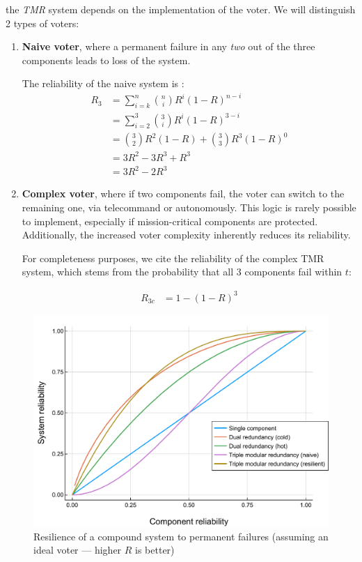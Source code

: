 \documentclass[a4paper,nobib]{tufte-book}
\begin{document}
 
 the \emph{\ac{TMR}} system depends on the implementation of the voter. We will distinguish 2 types of voters:
\begin{enumerate}
	\item \textbf{Naive voter}, where a permanent failure in any \emph{two} out of the three components leads to loss of the system.
	
	The reliability of the naive system is \autocite[31]{birolini_reliability_engineering_2004}:
	\begin{align}
	R_3 &= \sum_{i=k}^{n} \binom{n}{i} R^i (1-R)^{n-i}\nonumber\\
	&= \sum_{i=2}^{3} \binom{3}{i} R^i (1-R)^{3-i} \nonumber\\
	&= \binom{3}{2} R^2 (1-R) + \binom{3}{3} R^3 (1-R)^0 \nonumber\\
	&= 3R^2 - 3R^3 + R^3 \nonumber\\
	&= 3R^2 - 2R^3
	\label{eq:tmr}
	\end{align}
	
	\item \textbf{Complex voter}, where if two components fail, the voter can switch to the remaining one, via telecommand or autonomously. This logic is rarely possible to implement, especially if mission-critical components are protected. Additionally, the increased voter complexity inherently reduces its reliability.
	
	For completeness purposes, we cite the reliability of the complex \acs{TMR} system, which stems from the probability that all 3 components fail within \( t \):

	\begin{align}
	R_{3c} &= 1 - (1 - R)^3
	\label{eq:tmr_complex}
	\end{align}
\end{enumerate}


\begin{figure}
	\centering
	\includegraphics{analysis/reliability_norepair_en}
	\caption[Resilience of a compound system to permanent failures (assuming an ideal voter)]{Resilience of a compound system to permanent failures (assuming an ideal voter --- higher \(R\) is better)}
	\label{fig:reliability_norepair}
\end{figure}
\end{document}
